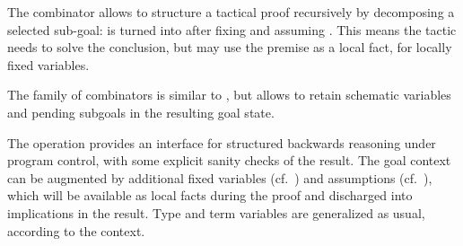 \begin{isabellebody}
\begin{isamarkuptext}
  \medskip The  combinator allows to structure a
  tactical proof recursively by decomposing a selected sub-goal:
   is turned into 
  after fixing  and assuming .  This means
  the tactic needs to solve the conclusion, but may use the premise as
  a local fact, for locally fixed variables.

  The family of  combinators is similar to , but allows to retain schematic variables and pending
  subgoals in the resulting goal state.

  The  operation provides an interface for structured
  backwards reasoning under program control, with some explicit sanity
  checks of the result.  The goal context can be augmented by
  additional fixed variables (cf.\ ) and
  assumptions (cf.\ ), which will be available
  as local facts during the proof and discharged into implications in
  the result.  Type and term variables are generalized as usual,
  according to the context.


\end{isamarkuptext}
\end{isabellebody}
